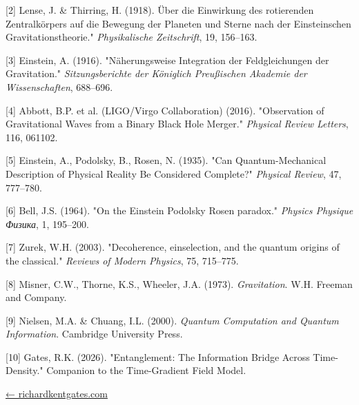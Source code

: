 \documentclass[
  10pt,
]{article}
\begin{document}
{[}2{]} Lense, J. \& Thirring, H. (1918). Über die Einwirkung des
rotierenden Zentralkörpers auf die Bewegung der Planeten und Sterne nach
der Einsteinschen Gravitationstheorie." \emph{Physikalische
Zeitschrift}, 19, 156--163.

{[}3{]} Einstein, A. (1916). "Näherungsweise Integration der
Feldgleichungen der Gravitation." \emph{Sitzungsberichte der Königlich
Preußischen Akademie der Wissenschaften}, 688--696.

{[}4{]} Abbott, B.P. et al. (LIGO/Virgo Collaboration) (2016).
"Observation of Gravitational Waves from a Binary Black Hole Merger."
\emph{Physical Review Letters}, 116, 061102.

{[}5{]} Einstein, A., Podolsky, B., Rosen, N. (1935). "Can
Quantum-Mechanical Description of Physical Reality Be Considered
Complete?" \emph{Physical Review}, 47, 777--780.

{[}6{]} Bell, J.S. (1964). "On the Einstein Podolsky Rosen paradox."
\emph{Physics Physique Физика}, 1, 195--200.

{[}7{]} Zurek, W.H. (2003). "Decoherence, einselection, and the quantum
origins of the classical." \emph{Reviews of Modern Physics}, 75,
715--775.

{[}8{]} Misner, C.W., Thorne, K.S., Wheeler, J.A. (1973).
\emph{Gravitation}. W.H. Freeman and Company.

{[}9{]} Nielsen, M.A. \& Chuang, I.L. (2000). \emph{Quantum Computation
and Quantum Information}. Cambridge University Press.

{[}10{]} Gates, R.K. (2026). "Entanglement: The Information Bridge
Across Time-Density." Companion to the Time-Gradient Field Model.

\href{https://richardkentgates.com/}{← richardkentgates.com}
\end{document}
